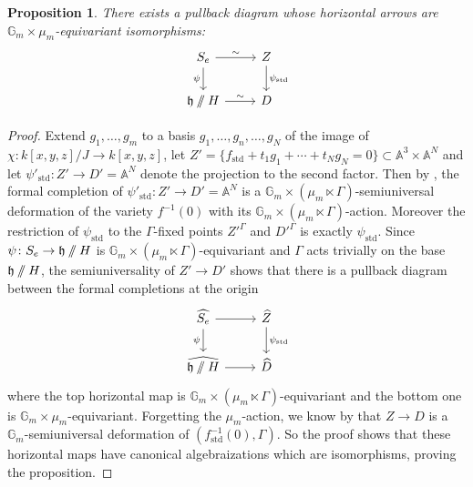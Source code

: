 \documentclass{article} %
\newtheorem{proposition}{Proposition}[section]
\numberwithin{equation}{section}
\theoremstyle{definition}
\newcommand{\G}{\mathbb{G}}
\newcommand{\A}{\mathbb{A}}
\newcommand{\GIT}{\mathbin{/\mkern-6mu/}}
\newcommand{\frakh}{\mathfrak h}
\begin{document}
\begin{proposition}\label{proposition: isomorphism between semiversal deformations}
    There exists a pullback diagram whose horizontal arrows are $\G_m\times \mu_m$-equivariant isomorphisms:
\[\begin{tikzcd}
	{S_e} & Z \\
	{\frakh \GIT H} & D
	\arrow["\sim", from=1-1, to=1-2]
	\arrow["\psi"', from=1-1, to=2-1]
	\arrow["{\psi_{\mathrm{std}}}", from=1-2, to=2-2]
	\arrow["\sim", from=2-1, to=2-2]
\end{tikzcd}\]
\end{proposition}
\begin{proof}
Extend $g_1, \dots, g_m$ to a basis $g_1, \dots, g_n , \dots, g_N$ of the image of $\chi\colon k[x,y,z]/J\rightarrow  k[x,y,z]$, let $Z' = \{f_{\mathrm{std}} + t_1 g_1 + \cdots + t_N g_N = 0\}\subset \A^3 \times \A^N$ and let $\psi'_{\mathrm{std}}\colon Z'\rightarrow D' = \A^N$ denote the projection to the second factor.
Then by \cite[Section 2.5]{Slodowy-simplesingularitiesalggroups}, the formal completion of $\psi'_{\mathrm{std}}\colon Z'\rightarrow D' = \A^N$ is a $\G_m \times (\mu_m \ltimes \Gamma)$-semiuniversal deformation of the variety $f^{-1}(0)$ with its $\G_m \times (\mu_m \ltimes \Gamma)$-action.
Moreover the restriction of $\psi_{\mathrm{std}}$ to the $\Gamma$-fixed points $Z'^{\Gamma}$ and $D'^{\Gamma}$ is exactly $\psi_{\mathrm{std}}$.
Since $\psi\colon S_e\rightarrow \frakh \GIT H$ is $\G_m\times (\mu_m\ltimes \Gamma)$-equivariant and $\Gamma$ acts trivially on the base $\frakh \GIT H$, the semiuniversality of $Z'\rightarrow D'$ shows that there is a pullback diagram between the formal completions at the origin
\[\begin{tikzcd}
	{\widehat{S_e}} & {\widehat{Z}} \\
	{\widehat{\frakh \GIT H}} & {\widehat{D}}
	\arrow[from=1-1, to=1-2]
	\arrow["\psi"', from=1-1, to=2-1]
	\arrow["{\psi_{\mathrm{std}}}", from=1-2, to=2-2]
	\arrow[from=2-1, to=2-2]
\end{tikzcd}\]
where the top horizontal map is $\G_m\times (\mu_m\ltimes \Gamma)$-equivariant and the bottom one is $\G_m\times \mu_m$-equivariant.
Forgetting the $\mu_m$-action, we know by \cite[Section 2.5, Theorem]{Slodowy-simplesingularitiesalggroups} that $Z\rightarrow D$ is a $\G_m$-semiuniversal deformation of $(f_{\mathrm{std}}^{-1}(0), \Gamma)$. 
So the proof \cite[Section 8.7, Theorem]{Slodowy-simplesingularitiesalggroups} shows that these horizontal maps have canonical algebraizations which are isomorphisms, proving the proposition.
\end{proof}
\end{document}
